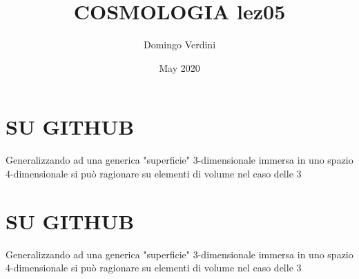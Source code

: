\documentclass{article}
\title{COSMOLOGIA lez05}
\author{Domingo Verdini }
\date{May 2020}
\begin{document}
\maketitle
    \section{SU GITHUB}
    Generalizzando ad una generica "superficie" 3-dimensionale immersa in uno spazio 4-dimensionale si può ragionare su elementi di volume nel caso delle 3
    \section{SU GITHUB}
    Generalizzando ad una generica "superficie" 3-dimensionale immersa in uno spazio 4-dimensionale si può ragionare su elementi di volume nel caso delle 3
    
\end{document}
